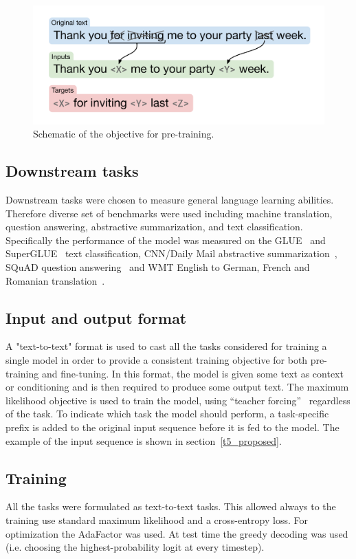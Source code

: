 \begin{figure}[H]
    \centering
    \includegraphics[scale=0.2]{figures/t5_pretraining.png}
    \caption{Schematic of the objective for pre-training.}
    \label{fig:t5_pretraining}
\end{figure}

\subsection*{Downstream tasks}
Downstream tasks were chosen to measure general language learning abilities. Therefore diverse set of benchmarks were used including machine translation, question answering, abstractive summarization, and text classification. Specifically the performance of the model was measured on the GLUE~\cite{glue} and SuperGLUE~\cite{superglue} text classification, CNN/Daily Mail abstractive summarization~\cite{daily_mail}, SQuAD question answering~\cite{squad} and WMT English to German, French and Romanian translation~\cite{wmt}.

\subsection*{Input and output format}
A "text-to-text" format is used to cast all the tasks considered for training a single model in order to provide a consistent training objective for both pre-training and fine-tuning. In this format, the model is given some text as context or conditioning and is then required to produce some output text. The maximum likelihood objective is used to train the model, using ``teacher forcing''~\cite{teacher_forcing} regardless of the task. To indicate which task the model should perform, a task-specific prefix is added to the original input sequence before it is fed to the model. The example of the input sequence is shown in section~\ref{t5_proposed}.

\subsection*{Training}
All the tasks were formulated as text-to-text tasks. This allowed always to the training use standard maximum likelihood and a cross-entropy loss. For optimization the AdaFactor was used. At test time the greedy decoding was used (i.e. choosing the highest-probability logit at every timestep).

